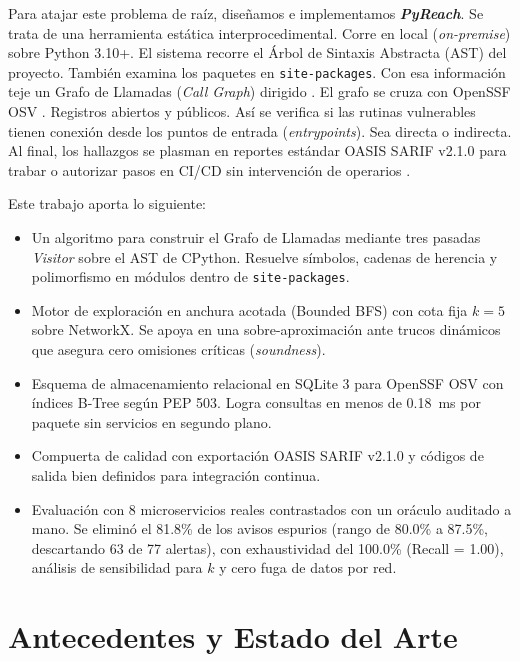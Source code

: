 \documentclass[conference]{IEEEtran}
\begin{document}
Para atajar este problema de raíz, diseñamos e implementamos \textbf{\textit{PyReach}}. Se trata de una herramienta estática interprocedimental. Corre en local (\textit{on-premise}) sobre Python 3.10+. El sistema recorre el Árbol de Sintaxis Abstracta (AST) del proyecto. También examina los paquetes en \texttt{site-packages}. Con esa información teje un Grafo de Llamadas (\textit{Call Graph}) dirigido \cite{salis2021pycg, ryder1979constructing}. El grafo se cruza con OpenSSF OSV \cite{openssf2023osv}. Registros abiertos y públicos. Así se verifica si las rutinas vulnerables tienen conexión desde los puntos de entrada (\textit{entrypoints}). Sea directa o indirecta. Al final, los hallazgos se plasman en reportes estándar OASIS SARIF v2.1.0 \cite{oasis2019sarif} para trabar o autorizar pasos en CI/CD sin intervención de operarios \cite{humble2010continuous}.

Este trabajo aporta lo siguiente:
\begin{itemize}
    \item Un algoritmo para construir el Grafo de Llamadas mediante tres pasadas \textit{Visitor} sobre el AST de CPython. Resuelve símbolos, cadenas de herencia y polimorfismo en módulos dentro de \texttt{site-packages}.
    \item Motor de exploración en anchura acotada (Bounded BFS) con cota fija $k=5$ sobre NetworkX. Se apoya en una sobre-aproximación ante trucos dinámicos que asegura cero omisiones críticas (\textit{soundness}).
    \item Esquema de almacenamiento relacional en SQLite 3 para OpenSSF OSV con índices B-Tree según PEP 503. Logra consultas en menos de 0.18~ms por paquete sin servicios en segundo plano.
    \item Compuerta de calidad con exportación OASIS SARIF v2.1.0 y códigos de salida bien definidos para integración continua.
    \item Evaluación con 8 microservicios reales contrastados con un oráculo auditado a mano. Se eliminó el 81.8\% de los avisos espurios (rango de 80.0\% a 87.5\%, descartando 63 de 77 alertas), con exhaustividad del 100.0\% (Recall = 1.00), análisis de sensibilidad para $k$ y cero fuga de datos por red.
\end{itemize}

\section{Antecedentes y Estado del Arte}
\end{document}
